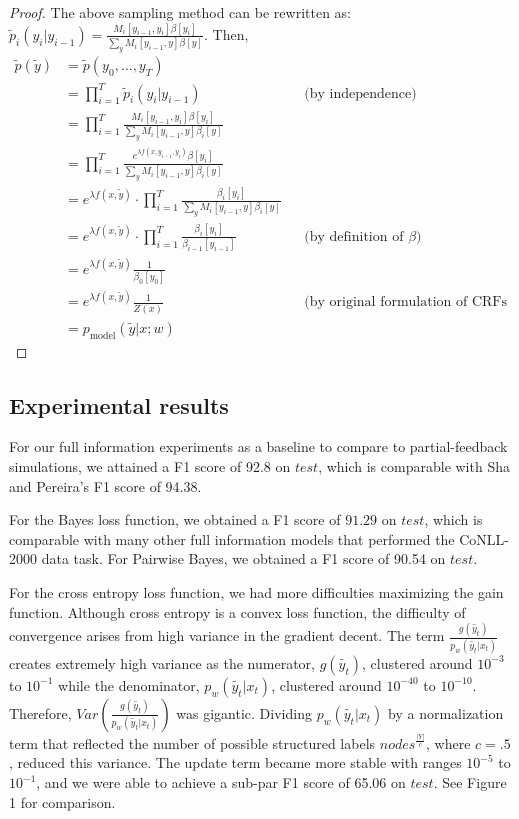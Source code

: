 \documentclass{article}
\begin{document}
\begin{proof}
The above sampling method can be rewritten as: $\tilde{p}_i(y_i|y_{i-1}) = \frac{M_i[y_{i-1}, y_i]\beta[y_i]}{\sum_y M_i[y_{i-1}, y]\beta[y]}$. Then,
\begin{align*}
  \tilde p(\tilde y) 
 &=\tilde p(y_0,\dots,y_{T})\\
 &= \prod_{i=1}^{T} \tilde p_i(y_i|y_{i-1})&& \text{(by independence)}\\
 &= \prod_{i=1}^{T} \frac{M_i[y_{i-1}, y_i]\beta[y_i]}{\sum_y M_i[y_{i-1}, y]\beta_i[y]}\\
 &= \prod_{i=1}^{T} \frac{e^{\lambda f(x,y_{i-1},y_i)}\beta[y_i]}{\sum_y M_i[y_{i-1}, y]\beta_i[y]}\\
 &= e^{\lambda f(x,\tilde y)} \cdot \prod_{i=1}^{T} \frac{\beta_i[y_i]}{\sum_y M_i[y_{i-1}, y]\beta_i[y]}\\
 &= e^{\lambda f(x,\tilde y)} \cdot \prod_{i=1}^{T} \frac{\beta_i[y_i]}{\beta_{i-1}[y_{i-1}]}&& \text{(by definition of $\beta$)}\\
 &= e^{\lambda f(x,\tilde y)} \frac{1}{\beta_{0}[y_{0}]}\\
 &= e^{\lambda f(x,\tilde y)} \frac{1}{Z(x)}&& \text{(by original formulation of CRFs in Laffety et al.)}\\
 &= p_{\text{model}}(\tilde y|x;w)
 \end{align*}
\end{proof}

\subsection*{Experimental results}
For our full information experiments as a baseline to compare to partial-feedback simulations, we attained a F1 score of 92.8 on $test$, which is comparable with Sha and Pereira's  F1 score of 94.38. 

For the Bayes loss function, we obtained a F1 score of $91.29$ on $test$, which is comparable with many other full information models that performed the CoNLL-2000 data task. For Pairwise Bayes, we obtained a F1 score of 90.54 on $test$. 

For the cross entropy loss function, we had more difficulties maximizing the gain function. Although cross entropy is a convex loss function, the difficulty of convergence arises from high variance in the gradient decent. The term $\frac{g(\tilde{y_{t}})}{p_{w}(\tilde{y_{t}}|x_{t})}$ creates extremely high variance as the numerator, $g(\tilde{y_{t}})$, clustered around $10^{-3}$ to $10^{-1}$ while the denominator, $p_{w}(\tilde{y_{t}}|x_{t})$, clustered around $10^{-40}$ to $10^{-10}$. Therefore, $Var(\frac{g(\tilde{y_{t}})}{p_{w}(\tilde{y_{t}}|x_{t})})$ was gigantic. Dividing $p_{w}(\tilde{y_{t}}|x_{t})$ by a normalization term that reflected the number of possible structured labels $nodes^{\frac{|Y|}{c}}$, where $c=.5$, reduced this variance. The update term became more stable with ranges $10^{-5}$ to $10^{-1}$, and we were able to achieve a sub-par F1 score of 65.06 on $test$. See Figure 1 for comparison. 
\end{document}
